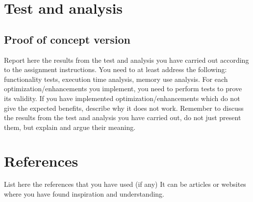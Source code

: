 \documentclass[a4paper, english]{article}
\numberwithin{equation}{section}
\begin{document}
\section{Test and analysis}
\subsection{Proof of concept version}\label{sec:poftest}
Report here the results from the test and analysis you have carried out according to the assignment instructions.  You need to at least address the following: functionality tests, execution time analysis, memory use analysis.
For each optimization/enhancements you implement, you need to perform tests to prove its validity. If you have implemented optimization/enhancements which do not give the expected benefits, describe why it does not work.
Remember to discuss the results from the test and analysis you have carried out, do not just present them, but explain and argue their meaning.
\section{References}
List here the references that you have used (if any) It can be articles or websites where you have found inspiration and understanding.

%
%




%
\end{document}
